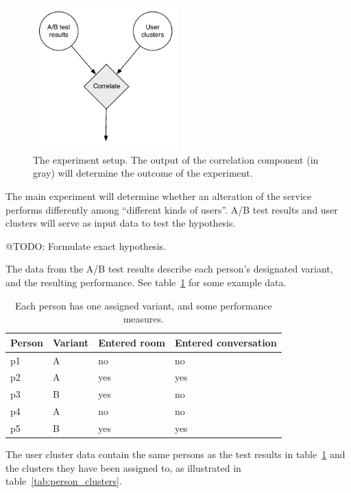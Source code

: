 \begin{figure}[h]
  \centering
    \includegraphics[width=0.5\textwidth]{Figures/experimental-setup}
    \caption{The experiment setup. The output of the correlation component (in gray) will determine the outcome of the experiment.}
    \label{fig:experimental-setup}
\end{figure}

The main experiment will determine whether an alteration of the service performs differently among ``different kinds of users''. A/B test results and user clusters will serve as input data to test the hypothesis.

@TODO: Formulate exact hypothesis.

The data from the A/B test results describe each person's designated variant, and the resulting performance. See table~\ref{tab:person_variants} for some example data.

\begin{table}[h]
  \centering
  \begin{tabular}{|llll|}
    \hline
    Person & Variant & Entered room & Entered conversation \\ \hline
    p1     & A       & no           & no  \\
    p2     & A       & yes          & yes \\
    p3     & B       & yes          & no  \\
    p4     & A       & no           & no  \\
    p5     & B       & yes          & yes \\ \hline
  \end{tabular}
  \caption{Each person has one assigned variant, and some performance measures.}
  \label{tab:person_variants}
\end{table}

The user cluster data contain the same persons as the test results in table~\ref{tab:person_variants} and the clusters they have been assigned to, as illustrated in table~\ref{tab:person_clusters}.

